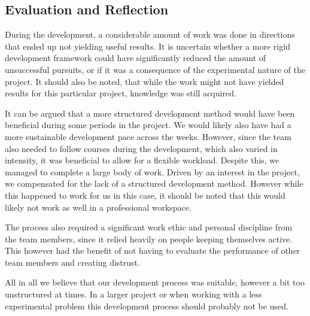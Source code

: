 \subsection{Evaluation and Reflection}
During the development, a considerable amount of work was done in directions that ended up not yielding useful results. It is uncertain whether a more rigid development framework could have significantly reduced the amount of unsuccessful pursuits, or if it was a consequence of the experimental nature of the project. It should also be noted, that while the work might not have yielded results for this particular project, knowledge was still acquired.

It can be argued that a more structured development method would have been beneficial during some periods in the project. We would likely also have had a more sustainable development pace across the weeks. However, since the team also needed to follow courses during the development, which also varied in intensity, it was beneficial to allow for a flexible workload.
Despite this, we managed to complete a large body of work. Driven by an interest in the project, we compensated for the lack of a structured development method. However while this happened to work for us in this case, it should be noted that this would likely not work as well in a professional workspace.

The process also required a significant work ethic and personal discipline from the team members, since it relied heavily on people keeping themselves active. This however had the benefit of not having to evaluate the performance of other team members and creating distrust.

All in all we believe that our development process was suitable, however a bit too unstructured at times. In a larger project or when working with a less experimental problem this development process should probably not be used.



